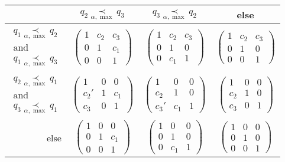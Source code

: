 \begin{center}
  \def\arraystretch{1.3}
  \setlength\tabcolsep{4mm}
  \begin{tabular}{r|c|c|c}
    & $q_2 \underset{\alpha,\max}{\prec} q_3$
    & $q_3 \underset{\alpha,\max}{\prec} q_2$
    & else
    \tabularnewline
    \hline
    $\substack{q_1 \underset{\alpha,\max}{\prec} q_2\\\text{and}
    \\q_1 \underset{\alpha,\max}{\prec} q_3}$
    & $\begin{pmatrix} 1 & c_2 & c_3 \\0 & 1 & c_1 \\0 & 0 & 1 \end{pmatrix}$
   \cellcolor{blue!15}
    & $\begin{pmatrix} 1 & c_2 & c_3 \\0 & 1 & 0 \\0 & c_1 & 1 \end{pmatrix}$
   \cellcolor{blue!15}
    & $\begin{pmatrix} 1 & c_2 & c_3 \\0 & 1 & 0 \\0 & 0 & 1 \end{pmatrix}$
   \cellcolor{green!15}
    \tabularnewline
    \hline
    $\substack{q_2 \underset{\alpha,\max}{\prec} q_1\\\text{and}
    \\q_3 \underset{\alpha,\max}{\prec} q_1}$
    & $\begin{pmatrix} 1 & 0 & 0 \\c_2' & 1 & c_1 \\c_3 & 0 & 1 \end{pmatrix}$
   \cellcolor{blue!15}
    & $\begin{pmatrix} 1 & 0 & 0 \\c_2 & 1 & 0 \\c_3' & c_1 & 1 \end{pmatrix}$
   \cellcolor{blue!15}
    & $\begin{pmatrix} 1 & 0 & 0 \\c_2 & 1 & 0 \\c_3 & 0 & 1 \end{pmatrix}$
   \cellcolor{green!15}
    \tabularnewline
    \hline
    else
    & $\begin{pmatrix} 1 & 0 & 0 \\0 & 1 & c_1 \\0 & 0 & 1 \end{pmatrix}$
   \cellcolor{purple!15}
    & $\begin{pmatrix} 1 & 0 & 0 \\0 & 1 & 0 \\0 & c_1 & 1 \end{pmatrix}$
   \cellcolor{purple!15}
    & $\begin{pmatrix} 1 & 0 & 0 \\0 & 1 & 0 \\0 & 0 & 1 \end{pmatrix}$
  \end{tabular}
\end{center}
